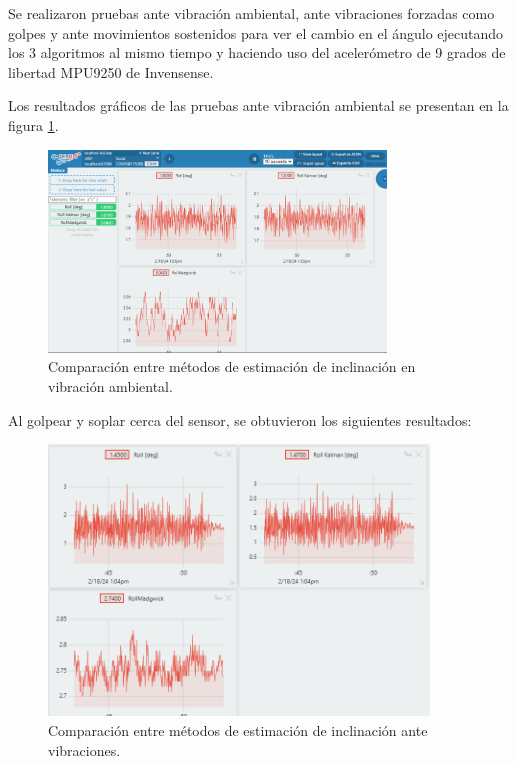 Se realizaron pruebas ante vibración ambiental, ante vibraciones forzadas como golpes y ante movimientos sostenidos para ver el cambio en el ángulo ejecutando los 3 algoritmos al mismo tiempo y haciendo uso del acelerómetro de 9 grados de libertad MPU9250 de Invensense. 

Los resultados gráficos de las pruebas ante vibración ambiental se presentan en la figura \ref{fig:pruebasinclinacion}.

 \begin{figure}[H]
    \centering
    \includegraphics[width = 0.8\textwidth]{imagenes/cap3_resultados/Pruebas ACL/Inclinacion/PruebaInclinacion.png}
    \caption{Comparación entre métodos de estimación de inclinación en vibración ambiental.}
    \label{fig:pruebasinclinacion}
\end{figure}

Al golpear y soplar cerca del sensor, se obtuvieron los siguientes resultados:

\begin{figure}[H]
    \centering
    \includegraphics[width = 0.9\textwidth]{imagenes/cap3_resultados/Pruebas ACL/Inclinacion/Comparacion M1 M2 M3 (Maggwick) ante vibraciones.png}
    \caption{Comparación entre métodos de estimación de inclinación ante vibraciones.}
    \label{fig:pruebasinclinacion2}
\end{figure}


